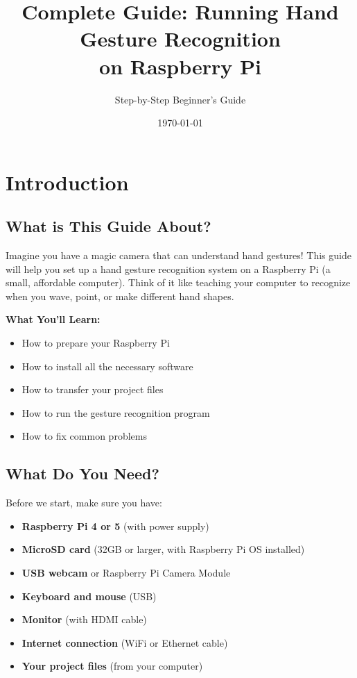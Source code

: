 \documentclass[12pt,a4paper]{article}
\title{\Huge\textbf{Complete Guide: Running Hand Gesture Recognition\\on Raspberry Pi}}
\author{Step-by-Step Beginner's Guide}
\date{\today}
\begin{document}
\maketitle

\tableofcontents
\newpage

\section{Introduction}

\subsection{What is This Guide About?}

Imagine you have a magic camera that can understand hand gestures! This guide will help you set up a hand gesture recognition system on a Raspberry Pi (a small, affordable computer). Think of it like teaching your computer to recognize when you wave, point, or make different hand shapes.

\begin{infobox}
\textbf{What You'll Learn:}
\begin{itemize}
    \item How to prepare your Raspberry Pi
    \item How to install all the necessary software
    \item How to transfer your project files
    \item How to run the gesture recognition program
    \item How to fix common problems
\end{itemize}
\end{infobox}

\subsection{What Do You Need?}

Before we start, make sure you have:

\begin{itemize}
    \item \textbf{Raspberry Pi 4 or 5} (with power supply)
    \item \textbf{MicroSD card} (32GB or larger, with Raspberry Pi OS installed)
    \item \textbf{USB webcam} or Raspberry Pi Camera Module
    \item \textbf{Keyboard and mouse} (USB)
    \item \textbf{Monitor} (with HDMI cable)
    \item \textbf{Internet connection} (WiFi or Ethernet cable)
    \item \textbf{Your project files} (from your computer)
\end{itemize}
\end{document}
